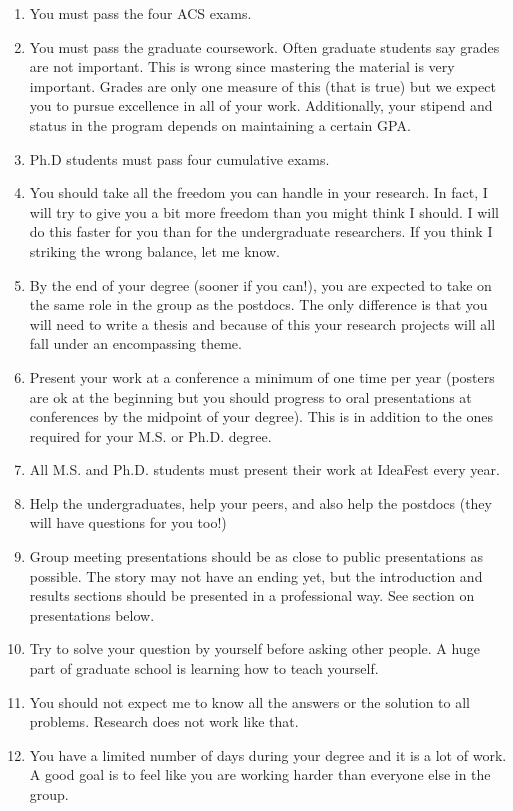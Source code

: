 \documentclass[letterpaper]{article}
\begin{document}
\begin{enumerate}
\item You must pass the four ACS exams.
\item You must pass the graduate coursework. Often graduate students say grades are not important. This is wrong since mastering the material is very important. Grades are only one measure of this (that is true) but we expect you to pursue excellence in all of your work.  Additionally, your stipend and status in the program depends on maintaining a certain GPA.
\item Ph.D students must pass four cumulative exams. 
\item You should take all the freedom you can handle in your research. In fact, I will try to give you a bit more freedom than you might think I should.  I will do this faster for you than for the undergraduate researchers. If you think I striking the wrong balance, let me know.
\item By the end of your degree (sooner if  you can!), you are expected to take on the same role in the group as the postdocs. The only difference is that you will need to write a thesis and because of this your research projects will all fall under an encompassing theme.
\item Present your work at a conference a minimum of one time per year (posters are ok at the beginning but you should progress to oral presentations at conferences by the midpoint of your degree). This is in addition to the ones required for your M.S. or Ph.D. degree. 
\item All M.S. and Ph.D. students must present their work at IdeaFest every year.
\item Help the undergraduates, help your peers, and also help the postdocs (they will have questions for you too!)
\item Group meeting presentations should be as close to public presentations as possible. The story may not have an ending yet, but the introduction and results sections should be presented in a professional way. See section on presentations below.
\item Try to solve your question by yourself before asking other people. A huge part of graduate school is learning how to teach yourself.
\item You should not expect me to know all the answers or the solution to all problems. Research does not work like that.
\item You have a limited number of days during your degree and it is a lot of work. A good goal is to feel like you are working harder than everyone else in the group.
\end{enumerate}
\end{document}
